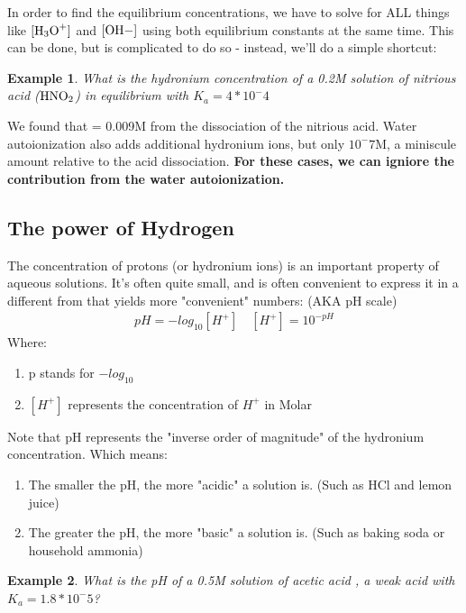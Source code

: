 \documentclass{article}  %
\newtheorem{exmp}{Example}
\begin{document}
In order to find the equilibrium concentrations, we have to solve for ALL things like $\ce{[H3O+]}$ and $\ce{[OH-]}$ using both equilibrium constants at the same time. 
\newline
This can be done, but is complicated to do so - instead, we'll do a simple shortcut:

\begin{exmp}
    What is the hydronium concentration of a 0.2M solution of nitrious acid ($\ce{HNO2}$) in equilibrium with $K_a = 4*10^-4$
\end{exmp}
We found that \ce{[H3O+]} = 0.009M from the dissociation of the nitrious acid. Water autoionization also adds additional hydronium ions, but only $10^-7$M, a miniscule amount relative to the acid dissociation.
\newline
\textbf{For these cases, we can igniore the contribution from the water autoionization.}

\subsection*{The power of Hydrogen}
The concentration of protons (or hydronium ions) is an important property of aqueous solutions. It's often quite small, and is often convenient to express it in a different from that yields more "convenient" numbers: (AKA pH scale)
\begin{equation*}
    \begin{aligned}
        pH = -log_{10}[H^+] \quad [H^+] = 10^{-pH}
    \end{aligned}
\end{equation*}
Where:
\begin{enumerate}
    \item p stands for $-log_10$
    \item $[H^+]$ represents the concentration of $H^+$ in Molar
\end{enumerate}
Note that pH represents the "inverse order of magnitude" of the hydronium concentration. Which means:
\begin{enumerate}
    \item The smaller the pH, the more "acidic" a solution is. (Such as HCl and lemon juice)
    \item The greater the pH, the more "basic" a solution is. (Such as baking soda or household ammonia)
\end{enumerate}

\begin{exmp}
    What is the pH of a 0.5M solution of acetic acid , a weak acid with $K_a = 1.8*10^-5$?
\end{exmp}
\end{document}
